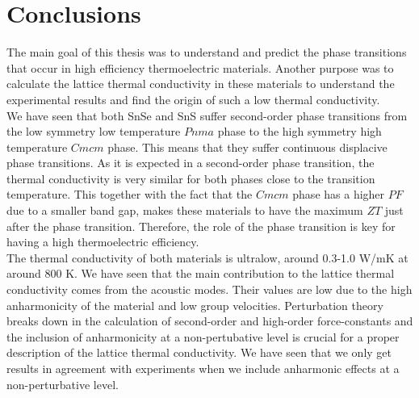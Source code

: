 
\chapter*{Conclusions} %

\label{Chapter9} %


The main goal of this thesis was to understand and predict the phase transitions that occur in high efficiency 
thermoelectric materials. Another purpose was to calculate the lattice thermal conductivity in these materials to 
understand the experimental results and find the origin of such a low thermal conductivity. \\

We have seen that both SnSe and SnS suffer second-order phase transitions from the low symmetry low temperature 
$Pnma$ phase to the high symmetry high temperature $Cmcm$ phase. This means that they suffer continuous displacive 
phase transitions. As it is expected in a second-order phase transition, the thermal conductivity is very similar 
for both phases close to the transition temperature. This together with the fact that the $Cmcm$ phase has a 
higher $PF$ due to a smaller band gap, makes these materials to have the maximum $ZT$ just after the phase 
transition. Therefore, the role of the phase transition is key for having a high thermoelectric efficiency. \\

The thermal conductivity of both materials is ultralow, around 0.3-1.0 W/mK at around $800$ K. We have seen that the 
main contribution to the lattice thermal conductivity comes from the acoustic modes. Their values are low due to the 
high anharmonicity of the material and low group velocities. Perturbation theory breaks down in the calculation of 
second-order and high-order force-constants and the inclusion of anharmonicity at a non-pertubative level is crucial 
for a proper description of the lattice thermal conductivity. We have seen that we only get results in agreement 
with experiments when we include anharmonic effects at a non-perturbative level. \\

